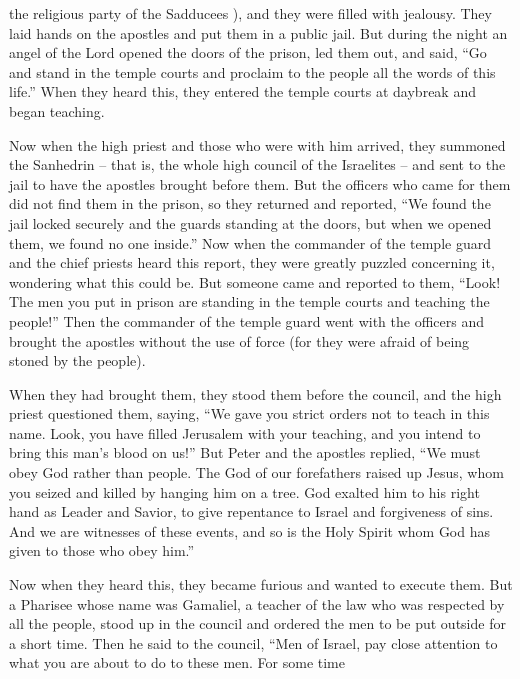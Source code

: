 {the religious party
of the Sadducees
), and they were filled
with jealousy.
They laid
hands
on
the apostles
and
put
them
in
a
public
jail.
But
during
the night
an angel
of the Lord
opened
the doors
of the prison,
led
them
out,
and
said,
“Go
and
stand
in
the temple courts
and proclaim
to the people
all
the words
of this
life.”
When
they heard
this, they entered
the temple courts
at daybreak
and
began teaching.
\par }{\PP Now
when the high priest
and
those who were with
him
arrived,
they summoned
the Sanhedrin –
that is, the whole
high council
of the Israelites –
and
sent
to
the jail
to have the apostles brought
before them.
But
the officers
who came
for them did not
find
them
in
the prison,
so they returned
and
reported,
“We found
the jail
locked
securely
and
the guards
standing
at
the doors,
but
when
we opened
them, we found
no one
inside.”
Now when
the commander
of the temple guard
and
the chief priests
heard
this
report,
they were greatly puzzled
concerning
it,
wondering what
this
could be.
But
someone
came
and reported
to them,
“Look! The men
you put
in
prison
are
standing
in
the temple courts
and
teaching
the people!”
Then
the commander of the temple guard
went
with
the officers
and brought
the apostles without
the use
of force
(for
they were afraid
of being stoned
by the people).
\par }{\PP {}When
they had brought
them,
they stood
them before
the council,
and
the high priest
questioned
them,
saying,
“We gave
you
strict
orders
not
to teach
in
this
name.
Look,
you have filled
Jerusalem
with your
teaching,
and
you intend
to bring
this
man’s
blood
on
us!”
But
Peter
and
the apostles
replied, “We must
obey
God
rather
than
people.
The God
of our
forefathers
raised up
Jesus,
whom
you
seized and killed
by hanging
him on
a tree.
God
exalted
him to his
right hand
as Leader
and
Savior,
to give
repentance
to Israel
and
forgiveness
of sins.
And
we
are
witnesses
of these
events,
and
so is the Holy
Spirit
whom
God
has given
to those who obey
him.”
\par }{\PP {}Now when
they heard
this, they became furious
and
wanted
to execute
them.
But
a Pharisee
whose name
was Gamaliel,
a teacher of the law
who was respected
by all
the people,
stood up
in
the council
and ordered
the men
to be put
outside
for a short time.
Then
he said
to
the council, “Men
of Israel,
pay close attention
to what
you are about
to do
to
these
men.
For
some time
}

